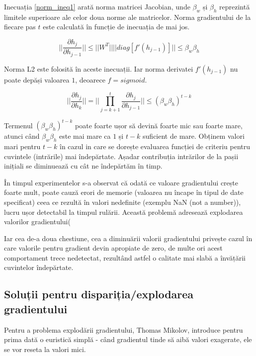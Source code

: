 Inecuația \ref{norm_ineq1} arată norma matricei Jacobian, unde $\beta_w$ și $\beta_h$ reprezintă limitele superioare ale celor doua norme ale matricelor. Norma gradientului de la fiecare pas $t$ este calculată în funcție de inecuația de mai jos.

\begin{equation}
	|| \frac{\partial h_j}{\partial h_{j-1}}|| \leq || W^T || || diag[f'(h_{j-1})]|| \leq \beta_w\beta_h
	\label{norm_ineq1}
\end{equation}

Norma L2 este folosită în aceste inecuații. Iar norma derivatei $f'(h_{j-1})$ nu poate depăși valoarea $1$, deoarece $f=sigmoid$.

\begin{equation}
	|| \frac{\partial h_j}{\partial h_k}|| = || \prod_{j=k+1}^{t} \frac{\partial h_j}{\partial h_{j-1}} || \leq (\beta_w\beta_h)^{t-k}
\end{equation}
 	
Termenul $(\beta_w\beta_h)^{t-k}$ poate foarte ușor să devină foarte mic sau foarte mare, atunci când $\beta_w\beta_h$ este mai mare ca $1$ și $t-k$ suficient de mare. Obținem valori mari pentru $t-k$ în cazul in care se dorește evaluarea funcției de criteriu pentru cuvintele (intrările) mai îndepărtate. Așadar contribuția intrărilor de la pașii inițiali se diminuează cu cât ne îndepărtăm în timp.

În timpul experimentelor s-a observat că odată ce valoare gradientului crește foarte mult, poate cauză erori de memorie (valoarea nu încape în tipul de date specificat) ceea ce rezultă în valori nedefinite (exemplu NaN (not a number)), lucru ușor detectabil la timpul rulării. Această problemă adresează explodarea valorilor gradientului(%

Iar cea de-a doua chestiune, cea a diminuării valorii gradientului privește cazul în care valorile pentru gradient devin apropiate de zero, de multe ori acest comportament trece nedetectat, rezultând astfel o calitate mai slabă a învățării cuvintelor îndepărtate.

\subsection{Soluții pentru dispariția/explodarea gradientului}

Pentru a problema explodării gradientului, Thomas Mikolov, introduce pentru prima dată o euristică simplă - când gradientul tinde să aibă valori exagerate, ele se vor reseta la valori mici.

